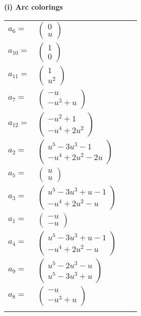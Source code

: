 \documentclass[1p]{elsarticle_modified}
\theoremstyle{definition}
\begin{document}
\flushleft \textbf{(i) Arc colorings}\\
\begin{tabular}{m{7pt} m{180pt} m{7pt} m{180pt} }
\flushright $a_{6}=$&$\begin{pmatrix}0\\u\end{pmatrix}$ \\
\flushright $a_{10}=$&$\begin{pmatrix}1\\0\end{pmatrix}$ \\
\flushright $a_{11}=$&$\begin{pmatrix}1\\u^2\end{pmatrix}$ \\
\flushright $a_{7}=$&$\begin{pmatrix}- u\\- u^3+u\end{pmatrix}$ \\
\flushright $a_{12}=$&$\begin{pmatrix}- u^2+1\\- u^4+2 u^2\end{pmatrix}$ \\
\flushright $a_{2}=$&$\begin{pmatrix}u^5-3 u^3-1\\- u^4+2 u^2-2 u\end{pmatrix}$ \\
\flushright $a_{5}=$&$\begin{pmatrix}u\\u\end{pmatrix}$ \\
\flushright $a_{3}=$&$\begin{pmatrix}u^5-3 u^3+u-1\\- u^4+2 u^2- u\end{pmatrix}$ \\
\flushright $a_{1}=$&$\begin{pmatrix}- u\\- u\end{pmatrix}$ \\
\flushright $a_{4}=$&$\begin{pmatrix}u^5-3 u^3+u-1\\- u^4+2 u^2- u\end{pmatrix}$ \\
\flushright $a_{9}=$&$\begin{pmatrix}u^5-2 u^3- u\\u^5-3 u^3+u\end{pmatrix}$ \\
\flushright $a_{8}=$&$\begin{pmatrix}- u\\- u^3+u\end{pmatrix}$\\&\end{tabular}
\end{document}

